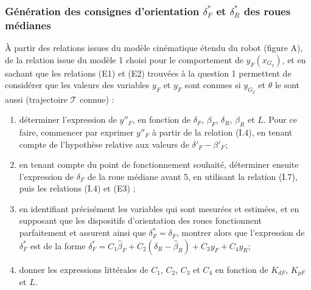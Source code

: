 \documentclass[11pt]{article}
\begin{document}
\subsubsection{Génération des consignes d'orientation $\delta_F^*$ et $\delta_R^*$ des roues médianes}


\UPSTIquestion À partir des relations issues du modèle cinématique étendu du robot (figure A), de la relation issue
du modèle 1 choisi pour le comportement de $y_F\left(x_{G_2}\right)$, et en sachant que les relations (E1) et (E2) trouvées à la question 1 permettent de considérer que les valeurs des variables $y_F$ et $y_F$ sont connues si $y_{G_2}$ et $\theta$ le sont aussi (trajectoire $\mathcal{T}$ connue) :
\begin{enumerate}
\item déterminer l’expression de $y''_F$, en fonction de $\delta_F$, $\beta_F$, $\delta_R$, $\beta_R$ et $L$. Pour ce faire, commencer par exprimer $y''_F$ à partir de la relation (I.4), en tenant compte de l’hypothèse relative aux valeurs de $\delta'_F-\beta'_F$;
\item en tenant compte du point de fonctionnement souhaité, déterminer ensuite l’expression de $\delta_F$ de la roue
médiane avant 5, en utilisant la relation (I.7), puis les relations (I.4) et (E3) ;
\item en identifiant précisément les variables qui sont mesurées et estimées, et en supposant que les dispositifs
d’orientation des roues fonctionnent parfaitement et assurent ainsi que $\delta^*_F = \delta_F$, montrer alors que l’expression de $\delta^*_F$ est de la forme $\delta^*_F =C_1 \hat{\beta}_F +C_2\left(\delta_R - \hat{\beta}_R\right)+C_3 y_F + C_4 y_R$;
\item donner les expressions littérales de $C_1$, $C_2$, $C_3$ et $C_4$ en fonction de $K_{dF}$, $K_{pF}$ et $L$.
\end{enumerate}
\end{document}
